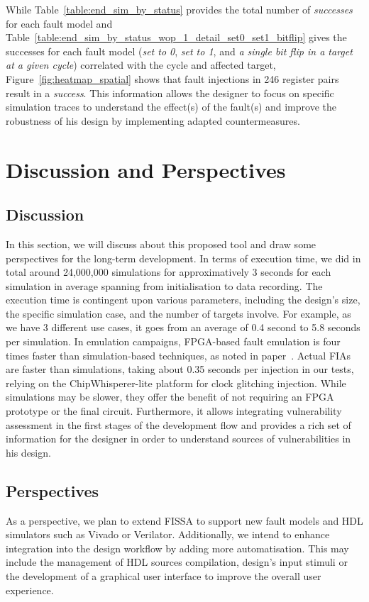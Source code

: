While Table~\ref{table:end_sim_by_status} provides the total number of \textit{successes} for each fault model and Table~\ref{table:end_sim_by_status_wop_1_detail_set0_set1_bitflip} gives the successes for each fault model (\textit{set to 0}, \textit{set to 1}, and \textit{a single bit flip in a target at a given cycle}) correlated with the cycle and affected target, Figure~\ref{fig:heatmap_spatial} shows that fault injections in 246 register pairs result in a \textit{success}. This information allows the designer to focus on specific simulation traces to understand the effect(s) of the fault(s) and improve the robustness of his design by implementing adapted countermeasures.

\section{Discussion and Perspectives}

\subsection{Discussion}
In this section, we will discuss about this proposed tool and draw some perspectives for the long-term development.
In terms of execution time, we did in total around 24,000,000 simulations for approximatively 3 seconds for each simulation in average spanning from initialisation to data recording.
The execution time is contingent upon various parameters, including the design's size, the specific simulation case, and the number of targets involve. For example, as we have 3 different use cases, it goes from an average of 0.4 second to 5.8 seconds per simulation.
In emulation campaigns, FPGA-based fault emulation is four times faster than simulation-based techniques, as noted in paper~\cite{NNHRS-14-dsd}. Actual FIAs are faster than simulations, taking about 0.35 seconds per injection in our tests, relying on the ChipWhisperer-lite platform for clock glitching injection.
While simulations may be slower, they offer the benefit of not requiring an FPGA prototype or the final circuit. Furthermore, it allows integrating vulnerability assessment in the first stages of the development flow and provides a rich set of information for the designer in order to understand sources of vulnerabilities in his design.

\subsection{Perspectives}
As a perspective, we plan to extend FISSA to support new fault models and HDL simulators such as Vivado or Verilator.
Additionally, we intend to enhance integration into the design workflow by adding more automatisation. This may include the management of HDL sources compilation, design's input stimuli or the development of a graphical user interface to improve the overall user experience.
